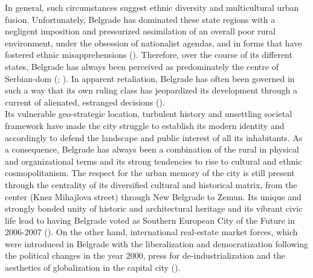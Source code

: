 \documentclass[11pt]{report}
\begin{document}
In general, such circumstances suggest ethnic diversity and multicultural urban fusion. Unfortunately, Belgrade  has dominated these state  regions with a negligent imposition and pressurized assimilation of an overall poor rural environment, under the obsession of nationalist agendas, and in forms that have fostered ethnic misapprehensions (\href{Samardzic}{\citealt{doytchinov_belgrade_2015}}).
Therefore, over the course of its different states, Belgrade has always been perceived as predominately the centre of Serbian-dom (\href{Savic}{\citealt{savic_where_2014}}; \href{Heppner}{\citealt{doytchinov_capital_2015}}).
In apparent retaliation, Belgrade has often been  governed in such a way that its own ruling class has jeopardized its development through a current of alienated, estranged decisions (\href{Doytchinov}{\citealt{doytchinov_belgrade_2015}}).
\\

Its vulnerable geo-strategic location, turbulent history and unsettling societal framework have made the city struggle to establish its modern identity and accordingly to defend the landscape and public interest of all its inhabitants. As a consequence, Belgrade has always been a combination of the rural in physical and organizational terms and its strong tendencies to rise to cultural and ethnic cosmopolitanism. The respect for the urban memory of the city is still present through the centrality of its diversified cultural and historical matrix, from the center (Knez Mihajlova street) through New Belgrade to Zemun. Its unique and strongly bonded unity of historic and architectural heritage and its vibrant civic life lead to having Belgrade voted as Southern European City of the Future in 2006-2007  (\href{Hirt}{\citealt{hirt_belgrade_2009}}).
On the other hand, international real-estate market forces, which were introduced in Belgrade with the liberalization and democratization following the political changes in the year 2000, press for de-industrialization and the aesthetics of globalization in the capital city  (\href{Grozdanic}{\citealt{grozdanic_belgrade_2008}}).
\\
\end{document}
